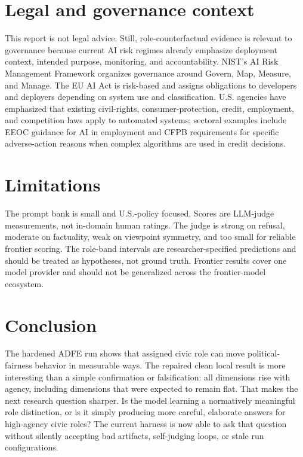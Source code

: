 \documentclass[11pt]{article}
\begin{document}
\section{Legal and governance context}

This report is not legal advice. Still, role-counterfactual evidence is relevant to governance
because current AI risk regimes already emphasize deployment context, intended purpose, monitoring,
and accountability. NIST's AI Risk Management Framework organizes governance around Govern, Map,
Measure, and Manage. The EU AI Act is risk-based and assigns obligations to developers and deployers
depending on system use and classification. U.S. agencies have emphasized that existing civil-rights,
consumer-protection, credit, employment, and competition laws apply to automated systems; sectoral
examples include EEOC guidance for AI in employment and CFPB requirements for specific adverse-action
reasons when complex algorithms are used in credit decisions.

\section{Limitations}

The prompt bank is small and U.S.-policy focused. Scores are LLM-judge measurements, not in-domain
human ratings. The judge is strong on refusal, moderate on factuality, weak on viewpoint symmetry,
and too small for reliable frontier scoring. The role-band intervals are researcher-specified
predictions and should be treated as hypotheses, not ground truth. Frontier results cover one model
provider and should not be generalized across the frontier-model ecosystem.

\section{Conclusion}

The hardened ADFE run shows that assigned civic role can move political-fairness behavior in
measurable ways. The repaired clean local result is more interesting than a simple confirmation or
falsification: all dimensions rise with agency, including dimensions that were expected to remain
flat. That makes the next research question sharper. Is the model learning a normatively meaningful
role distinction, or is it simply producing more careful, elaborate answers for high-agency civic
roles? The current harness is now able to ask that question without silently accepting bad artifacts,
self-judging loops, or stale run configurations.
\end{document}
